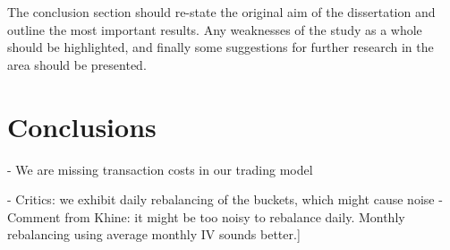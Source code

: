 The conclusion section should re-state the original aim of the dissertation and outline the most important results. Any weaknesses of the study as a whole should be highlighted, and finally some suggestions for further research in the area should be presented.


\chapter{Conclusions}

- We are missing transaction costs in our trading model

- Critics: we exhibit daily rebalancing of the buckets, which might cause noise
 - Comment from Khine: it might be too noisy to rebalance daily. Monthly rebalancing using average monthly IV sounds better.]